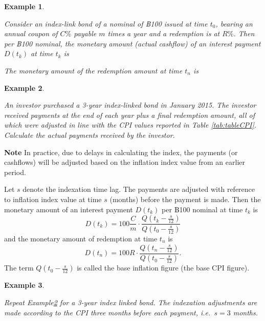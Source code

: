 \documentclass[landscape, 20pt]{extreport}
\theoremstyle{definition}
\theoremstyle{definition}
\newtheorem{example}{Example}[chapter]
\theoremstyle{definition}
\theoremstyle{definition}
\theoremstyle{remark}
\begin{document}
\newpage \begin{example}
\protect\hypertarget{exm:unlabeled-div-56}{}\label{exm:unlabeled-div-56}

\emph{Consider an index-link bond of a nominal of ฿100
issued at time \(t_0\), bearing an annual coupon of \(C\%\) payable \(m\)
times a year and a redemption is at \(R\%\). Then per ฿100 nominal, the
monetary amount (actual cashflow) of an interest payment \(D(t_k)\) at
time \(t_k\) is}

\emph{The monetary amount of the redemption amount at time \(t_n\) is}

\end{example}

\newpage \begin{example}
\protect\hypertarget{exm:exampleILB}{}\label{exm:exampleILB}

\emph{An investor purchased a 3-year index-linked bond in
January 2015. The investor received payments at the end of each year
plus a final redemption amount, all of which were adjusted in line with
the CPI values reported in Table \ref{tab:tableCPI}.
Calculate the actual payments received by the investor.}

\end{example}

\textbf{Note} In practice, due to delays in calculating the index, the
payments (or cashflows) will be adjusted based on the inflation index
value from an earlier period.

Let \(s\) denote the indexation time lag. The payments are adjusted with
reference to inflation index value at time \(s\) (months) before the
payment is made. Then the monetary amount of an interest payment
\(D(t_k)\) per ฿100 nominal at time \(t_k\) is
\[\displaystyle D(t_k) = 100 \frac{C}{m} \cdot \frac{Q(t_k - \frac{s}{12})}{Q(t_0 - \frac{s}{12})}\]
and the monetary amount of redemption at time \(t_n\) is
\[D(t_n) = 100 R \cdot \frac{Q(t_n - \frac{s}{12})}{Q(t_0 - \frac{s}{12})}.\]
The term \(Q(t_0 - \frac{s}{12})\) is called the base inflation figure
(the base CPI figure).

\newpage \begin{example}
\protect\hypertarget{exm:unlabeled-div-57}{}\label{exm:unlabeled-div-57}

\emph{Repeat Example\ref{exm:exampleILB}
for a 3-year index linked bond. The indexation adjustments are made
according to the CPI three months before each payment, i.e.~\(s = 3\)
months.}

\end{example}
\end{document}
